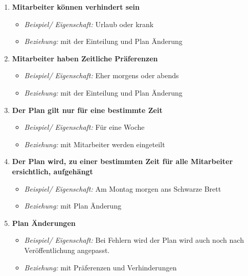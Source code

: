 \begin{enumerate} [a)]
\begin{enumerate}[1.]
        \item \textbf{Mitarbeiter können verhindert sein}
        \begin{itemize}
            \item \emph{Beispiel/ Eigenschaft:} Urlaub oder krank
            \item \emph{Beziehung:} mit der Einteilung und Plan Änderung
        \end{itemize}
        
        \item \textbf{Mitarbeiter haben Zeitliche Präferenzen}
        \begin{itemize}
            \item \emph{Beispiel/ Eigenschaft:} Eher morgens oder abends
            \item \emph{Beziehung:} mit der Einteilung und Plan Änderung 
        \end{itemize}
        
        \item \textbf{Der Plan gilt nur für eine bestimmte Zeit}
        \begin{itemize}
            \item \emph{Beispiel/ Eigenschaft:} Für eine Woche
            \item \emph{Beziehung:} mit Mitarbeiter werden eingeteilt
        \end{itemize}
        
        \item \textbf{Der Plan wird, zu einer bestimmten Zeit für alle Mitarbeiter ersichtlich, aufgehängt}
        \begin{itemize}
            \item \emph{Beispiel/ Eigenschaft:} Am Montag morgen ans Schwarze Brett
            \item \emph{Beziehung:} mit Plan Änderung
        \end{itemize}
        
        \item \textbf{Plan Änderungen}
        \begin{itemize}
            \item \emph{Beispiel/ Eigenschaft:} Bei Fehlern wird der Plan wird auch noch nach Veröffentlichung angepasst.
            \item \emph{Beziehung:} mit Präferenzen und Verhinderungen
        \end{itemize}
        
    \end{enumerate}
    

\end{enumerate}
